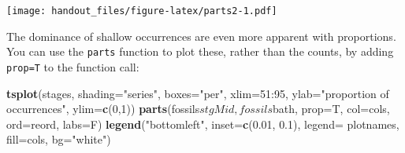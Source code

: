 \documentclass[]{article}
\newenvironment{Shaded}{\begin{snugshade}}{\end{snugshade}}
\newcommand{\KeywordTok}[1]{\textcolor[rgb]{0.13,0.29,0.53}{\textbf{{#1}}}}
\newcommand{\DataTypeTok}[1]{\textcolor[rgb]{0.13,0.29,0.53}{{#1}}}
\newcommand{\DecValTok}[1]{\textcolor[rgb]{0.00,0.00,0.81}{{#1}}}
\newcommand{\FloatTok}[1]{\textcolor[rgb]{0.00,0.00,0.81}{{#1}}}
\newcommand{\StringTok}[1]{\textcolor[rgb]{0.31,0.60,0.02}{{#1}}}
\newcommand{\CommentTok}[1]{\textcolor[rgb]{0.56,0.35,0.01}{\textit{{#1}}}}
\newcommand{\NormalTok}[1]{{#1}}
\begin{document}
\begin{Shaded}
\end{Shaded}

\texttt{[image: handout\_files/figure-latex/parts2-1.pdf]}

The dominance of shallow occurrences are even more apparent with
proportions. You can use the \texttt{parts} function to plot these,
rather than the counts, by adding \texttt{prop=T} to the function call:

\begin{Shaded}
\begin{Highlighting}[]
\KeywordTok{tsplot}\NormalTok{(stages, }\DataTypeTok{shading=}\StringTok{"series"}\NormalTok{, }\DataTypeTok{boxes=}\StringTok{"per"}\NormalTok{, }\DataTypeTok{xlim=}\DecValTok{51}\NormalTok{:}\DecValTok{95}\NormalTok{,}
    \DataTypeTok{ylab=}\StringTok{"proportion of occurrences"}\NormalTok{, }\DataTypeTok{ylim=}\KeywordTok{c}\NormalTok{(}\DecValTok{0}\NormalTok{,}\DecValTok{1}\NormalTok{))}
\KeywordTok{parts}\NormalTok{(fossils$stgMid, fossils$bath, }\DataTypeTok{prop=}\NormalTok{T, }\DataTypeTok{col=}\NormalTok{cols, }\DataTypeTok{ord=}\NormalTok{reord, }\DataTypeTok{labs=}\NormalTok{F)}
\KeywordTok{legend}\NormalTok{(}\StringTok{"bottomleft"}\NormalTok{, }\DataTypeTok{inset=}\KeywordTok{c}\NormalTok{(}\FloatTok{0.01}\NormalTok{, }\FloatTok{0.1}\NormalTok{), }
  \DataTypeTok{legend=} \NormalTok{plotnames, }\DataTypeTok{fill=}\NormalTok{cols, }\DataTypeTok{bg=}\StringTok{"white"}\NormalTok{)}
\end{Highlighting}
\end{Shaded}
\end{document}
